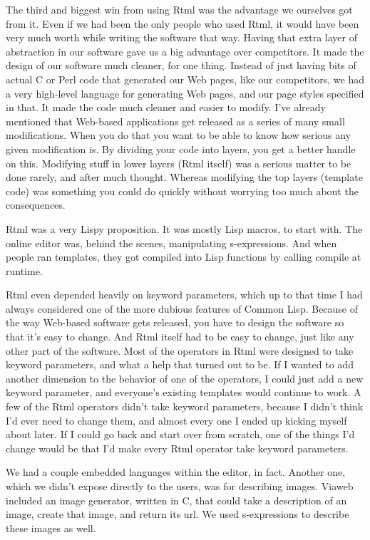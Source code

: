 \documentclass[12pt]{book}
\begin{document}
The third and biggest win from using Rtml was the advantage we ourselves
got from it. Even if we had been the only people who used Rtml, it would
have been very much worth while writing the software that way. Having
that extra layer of abstraction in our software gave us a big advantage
over competitors. It made the design of our software much cleaner, for
one thing. Instead of just having bits of actual C or Perl code that
generated our Web pages, like our competitors, we had a very high-level
language for generating Web pages, and our page styles specified in
that. It made the code much cleaner and easier to modify. I've already
mentioned that Web-based applications get released as a series of many
small modifications. When you do that you want to be able to know how
serious any given modification is. By dividing your code into layers,
you get a better handle on this. Modifying stuff in lower layers (Rtml
itself) was a serious matter to be done rarely, and after much thought.
Whereas modifying the top layers (template code) was something you could
do quickly without worrying too much about the consequences.

Rtml was a very Lispy proposition. It was mostly Lisp macros, to start
with. The online editor was, behind the scenes, manipulating
s-expressions. And when people ran templates, they got compiled into
Lisp functions by calling compile at runtime.

Rtml even depended heavily on keyword parameters, which up to that time
I had always considered one of the more dubious features of Common Lisp.
Because of the way Web-based software gets released, you have to design
the software so that it's easy to change. And Rtml itself had to be easy
to change, just like any other part of the software. Most of the
operators in Rtml were designed to take keyword parameters, and what a
help that turned out to be. If I wanted to add another dimension to the
behavior of one of the operators, I could just add a new keyword
parameter, and everyone's existing templates would continue to work. A
few of the Rtml operators didn't take keyword parameters, because I
didn't think I'd ever need to change them, and almost every one I ended
up kicking myself about later. If I could go back and start over from
scratch, one of the things I'd change would be that I'd make every Rtml
operator take keyword parameters.

We had a couple embedded languages within the editor, in fact. Another
one, which we didn't expose directly to the users, was for describing
images. Viaweb included an image generator, written in C, that could
take a description of an image, create that image, and return its url.
We used s-expressions to describe these images as well.
\end{document}
